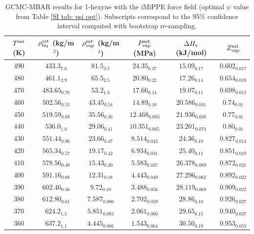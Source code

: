 \documentclass[journal=jctc,manuscript=article]{achemso}
\begin{document}
\begin{table}[htb!]
	\caption{GCMC-MBAR results for 1-hexyne with the iMiPPE force field (optimal $\psi$ value from Table \ref{SI tab: psi opt}). Subscripts correspond to the 95\% confidence interval computed with bootstrap re-sampling.}
	\begin{center}
		\begin{tabular}{|c|c|c|c|c|c|}
			\hline
			$T^{\rm sat}$ (K) & $\rho_{\rm liq}^{\rm sat}$ (kg/m$^3$) & $\rho_{\rm vap}^{\rm sat}$ (kg/m$^3$) & $P_{\rm vap}^{\rm sat}$ (MPa) & $\Delta H_{\rm v}$ (kJ/mol) & $Z_{\rm vap}^{\rm sat}$ \\ \hline
			490 & $433.3_{7.6}$ & $81.5_{3.5}$ & $24.35_{0.37}$ & $15.09_{0.17}$ & $0.602_{0.017}$ \\
			480 & $461.1_{2.9}$ & $65.5_{2.5}$ & $20.80_{0.22}$ & $17.26_{0.14}$ & $0.654_{0.019}$ \\
			470 & $483.65_{0.76}$ & $53.2_{1.3}$ & $17.66_{0.14}$ & $19.07_{0.11}$ & $0.698_{0.013}$ \\
			460 & $502.56_{0.55}$ & $43.45_{0.54}$ & $14.89_{0.10}$ & $20.586_{0.041}$ & $0.74_{0.01}$ \\
			450 & $519.59_{0.69}$ & $35.56_{0.36}$ & $12.468_{0.083}$ & $21.936_{0.038}$ & $0.77_{0.01}$ \\
			440 & $536.0_{1.0}$ & $29.06_{0.41}$ & $10.351_{0.065}$ & $23.201_{0.073}$ & $0.80_{0.01}$ \\
			430 & $551.44_{0.96}$ & $23.66_{0.47}$ & $8.514_{0.043}$ & $24.36_{0.10}$ & $0.827_{0.014}$ \\
			420 & $565.34_{0.57}$ & $19.17_{0.42}$ & $6.934_{0.031}$ & $25.40_{0.11}$ & $0.851_{0.019}$ \\
			410 & $578.56_{0.49}$ & $15.43_{0.30}$ & $5.583_{0.037}$ & $26.378_{0.089}$ & $0.872_{0.021}$ \\
			400 & $591.16_{0.88}$ & $12.31_{0.18}$ & $4.443_{0.049}$ & $27.296_{0.062}$ & $0.892_{0.022}$ \\
			390 & $602.46_{0.56}$ & $9.72_{0.10}$ & $3.488_{0.056}$ & $28.119_{0.069}$ & $0.909_{0.022}$ \\
			380 & $612.80_{0.61}$ & $7.587_{0.080}$ & $2.702_{0.059}$ & $28.86_{0.10}$ & $0.926_{0.027}$ \\
			370 & $624.2_{1.5}$ & $5.851_{0.083}$ & $2.061_{0.060}$ & $29.65_{0.15}$ & $0.940_{0.037}$ \\
			360 & $637.2_{1.1}$ & $4.445_{0.086}$ & $1.543_{0.064}$ & $30.50_{0.19}$ & $0.953_{0.053}$ \\
			\hline
		\end{tabular}
	\end{center}
\end{table}
\end{document}
